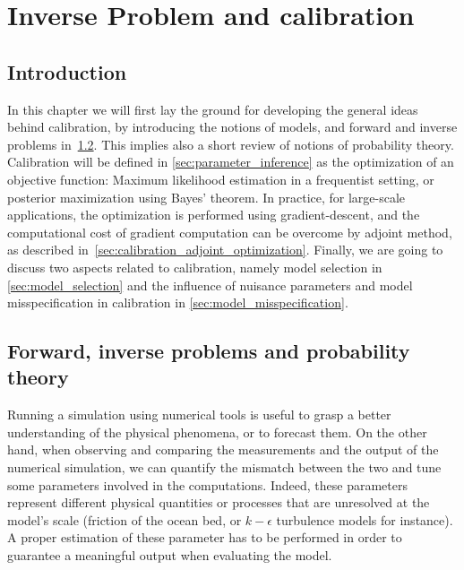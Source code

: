 \documentclass[../../Main_ManuscritThese.tex]{subfiles}
\begin{document}
\chapter{Inverse Problem and calibration}
\label{chap:inverse_problem}

\minitoc
\listoftodos
\newpage
\subfileLocal{\pagestyle{contentStyle}}

\section{Introduction}
\label{sec:intro_chap2}
In this chapter we will first lay the ground for developing the general ideas behind calibration, by introducing the notions of models, and forward and inverse problems in~\cref{sec:forward_inverse_problem_proba_theory}. This implies also a short review of notions of probability theory. Calibration will be defined in \cref{sec:parameter_inference} as the optimization of an objective function: Maximum likelihood estimation in a frequentist setting, or posterior maximization using Bayes' theorem. In practice, for large-scale applications, the optimization is performed using gradient-descent, and the computational cost of gradient computation can be overcome by adjoint method, as described in~\cref{sec:calibration_adjoint_optimization}. Finally, we are going to discuss two aspects related to calibration, namely model selection in \cref{sec:model_selection} and the influence of nuisance parameters and model misspecification in calibration in \cref{sec:model_misspecification}.

\section{Forward, inverse problems and probability theory}
\label{sec:forward_inverse_problem_proba_theory}
Running a simulation using numerical tools is useful to grasp a better understanding of the physical phenomena, or to forecast them. On the other hand, when observing and comparing the measurements and the output of the numerical simulation, we can quantify the mismatch between the two and tune some parameters involved in the computations. Indeed, these parameters represent different physical quantities or processes that are unresolved at the model's scale (friction of the ocean bed, or $k-\epsilon$ turbulence models for instance). A proper estimation of these parameter has to be performed in order to guarantee a meaningful output when evaluating the model.
\end{document}
